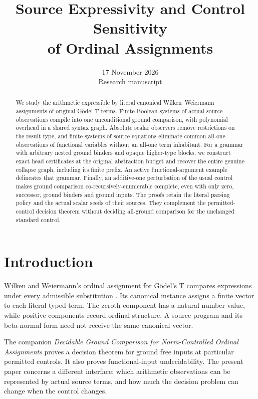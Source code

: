 \documentclass[11pt,a4paper]{article}
\title{Source Expressivity and Control Sensitivity\\of Ordinal Assignments}
\author{}
\date{17 November 2026\\Research manuscript}
\numberwithin{equation}{section}
\theoremstyle{definition}
\theoremstyle{remark}
\begin{document}
\maketitle
\begin{abstract}
We study the arithmetic expressible by literal canonical
Wilken--Weiermann assignments of original G\"odel T terms. Finite
Boolean systems of actual source observations compile into one
unconditional ground comparison, with polynomial overhead in a shared
syntax graph. Absolute scalar observers remove restrictions on the
result type, and finite systems of source equations eliminate common
all-one observations of functional variables without an all-one term
inhabitant. For a grammar with arbitrary nested ground binders and
opaque higher-type blocks, we construct exact head certificates at the
original abstraction budget and recover the entire genuine collapse
graph, including its finite prefix. An active functional-argument
example delineates that grammar. Finally, an additive-one perturbation
of the usual control makes ground comparison co-recursively-enumerable
complete, even with only zero, successor, ground binders and ground
inputs. The proofs retain the literal parsing policy and the actual
scalar seeds of their sources. They complement the permitted-control
decision theorem without deciding all-ground comparison for the
unchanged standard control.
\end{abstract}
\tableofcontents

\section{Introduction}

Wilken and Weiermann's ordinal assignment for G\"odel's T compares
expressions under every admissible substitution \cite{ww}. Its
canonical instance assigns a finite vector to each literal typed term.
The zeroth component has a natural-number value, while positive
components record ordinal structure. A source program and its
beta-normal form need not receive the same canonical vector.

The companion \emph{Decidable Ground Comparison for Norm-Controlled
Ordinal Assignments} \cite{groundcomparison} proves a decision theorem
for ground free inputs at particular permitted controls. It also proves
functional-input undecidability. The present paper concerns a different
interface: which arithmetic observations can be represented by actual
source terms, and how much the decision problem can change when the
control changes.
\end{document}
